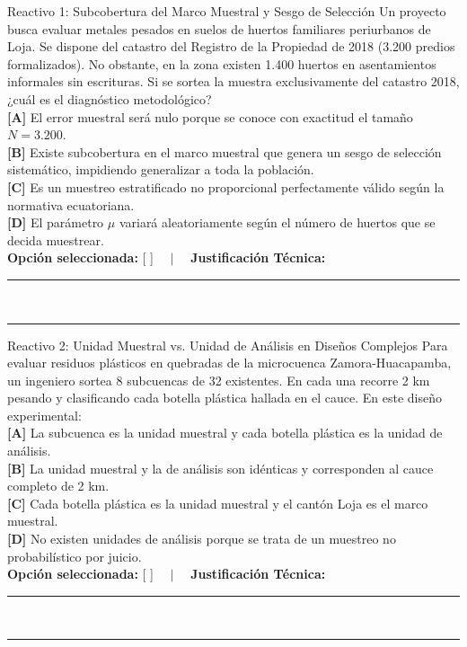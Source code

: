 \documentclass[11pt,a4paper]{article}
\begin{document}
\begin{reactivobox}{Reactivo 1: Subcobertura del Marco Muestral y Sesgo de Selección}
Un proyecto busca evaluar metales pesados en suelos de huertos familiares periurbanos de Loja. Se dispone del catastro del Registro de la Propiedad de 2018 (3.200 predios formalizados). No obstante, en la zona existen 1.400 huertos en asentamientos informales sin escrituras. Si se sortea la muestra exclusivamente del catastro 2018, ¿cuál es el diagnóstico metodológico?\\
\textbf{[A]} El error muestral será nulo porque se conoce con exactitud el tamaño $N = 3.200$.\\
\textbf{[B]} Existe subcobertura en el marco muestral que genera un sesgo de selección sistemático, impidiendo generalizar a toda la población.\\
\textbf{[C]} Es un muestreo estratificado no proporcional perfectamente válido según la normativa ecuatoriana.\\
\textbf{[D]} El parámetro $\mu$ variará aleatoriamente según el número de huertos que se decida muestrear.\\[4pt]
\textbf{Opción seleccionada:} [ \quad ] $\quad \vert \quad$ \textbf{Justificación Técnica:}\\
\rule{\linewidth}{0.4pt}\\[2pt]
\rule{\linewidth}{0.4pt}
\end{reactivobox}

\begin{reactivobox}{Reactivo 2: Unidad Muestral vs. Unidad de Análisis en Diseños Complejos}
Para evaluar residuos plásticos en quebradas de la microcuenca Zamora-Huacapamba, un ingeniero sortea 8 subcuencas de 32 existentes. En cada una recorre 2 km pesando y clasificando cada botella plástica hallada en el cauce. En este diseño experimental:\\
\textbf{[A]} La subcuenca es la unidad muestral y cada botella plástica es la unidad de análisis.\\
\textbf{[B]} La unidad muestral y la de análisis son idénticas y corresponden al cauce completo de 2 km.\\
\textbf{[C]} Cada botella plástica es la unidad muestral y el cantón Loja es el marco muestral.\\
\textbf{[D]} No existen unidades de análisis porque se trata de un muestreo no probabilístico por juicio.\\[4pt]
\textbf{Opción seleccionada:} [ \quad ] $\quad \vert \quad$ \textbf{Justificación Técnica:}\\
\rule{\linewidth}{0.4pt}\\[2pt]
\rule{\linewidth}{0.4pt}
\end{reactivobox}
\end{document}
